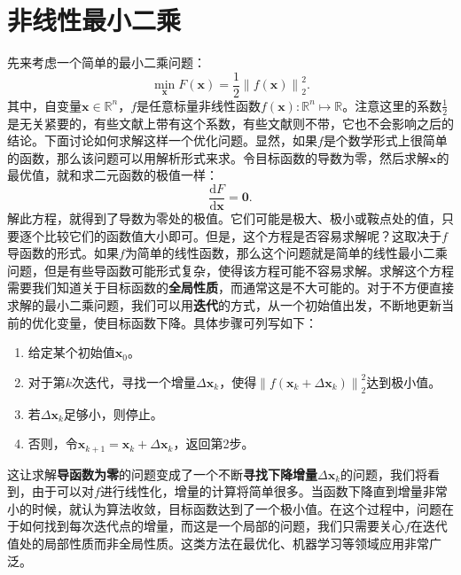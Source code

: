 \section{非线性最小二乘}
先来考虑一个简单的最小二乘问题：
\begin{equation}
\mathop {\min }\limits_{\bm{x}} F(\bm{x}) = \frac{1}{2}{\left\| {f\left( \bm{x} \right)} \right\|^2_2}.
\end{equation}
其中，自变量$\bm{x} \in \mathbb{R}^n$，$f$是任意标量非线性函数$f(\bm{x}): \mathbb{R}^n \mapsto \mathbb{R}$。注意这里的系数$\frac{1}{2}$是无关紧要的，有些文献上带有这个系数，有些文献则不带，它也不会影响之后的结论。下面讨论如何求解这样一个优化问题。显然，如果$f$是个数学形式上很简单的函数，那么该问题可以用解析形式来求。令目标函数的导数为零，然后求解$\bm{x}$的最优值，就和求二元函数的极值一样：
\begin{equation}
\frac{ \mathrm{d} F}{ \mathrm{d} \bm{x} } = \bm{0}.
\end{equation}
解此方程，就得到了导数为零处的极值。它们可能是极大、极小或鞍点处的值，只要逐个比较它们的函数值大小即可。但是，这个方程是否容易求解呢？这取决于$f$导函数的形式。如果$f$为简单的线性函数，那么这个问题就是简单的线性最小二乘问题，但是有些导函数可能形式复杂，使得该方程可能不容易求解。求解这个方程需要我们知道关于目标函数的\textbf{全局性质}，而通常这是不大可能的。对于不方便直接求解的最小二乘问题，我们可以用\textbf{迭代}的方式，从一个初始值出发，不断地更新当前的优化变量，使目标函数下降。具体步骤可列写如下：

\begin{mdframed}  
\begin{enumerate}
	\item 给定某个初始值$\bm{x}_0$。
	\item 对于第$k$次迭代，寻找一个增量$\Delta \bm{x}_k$，使得$\left\| {f\left( \bm{x}_k + \Delta \bm{x}_k \right)} \right \|^2_2$达到极小值。
	\item 若$\Delta \bm{x}_k$足够小，则停止。
	\item 否则，令$\bm{x}_{k+1} = \bm{x}_k+\Delta \bm{x}_k$，返回第2步。
\end{enumerate}
\end{mdframed}
这让求解\textbf{导函数为零}的问题变成了一个不断\textbf{寻找下降增量}$\Delta \bm{x}_k$的问题，我们将看到，由于可以对$f$进行线性化，增量的计算将简单很多。当函数下降直到增量非常小的时候，就认为算法收敛，目标函数达到了一个极小值。在这个过程中，问题在于如何找到每次迭代点的增量，而这是一个局部的问题，我们只需要关心$f$在迭代值处的局部性质而非全局性质。这类方法在最优化、机器学习等领域应用非常广泛。

